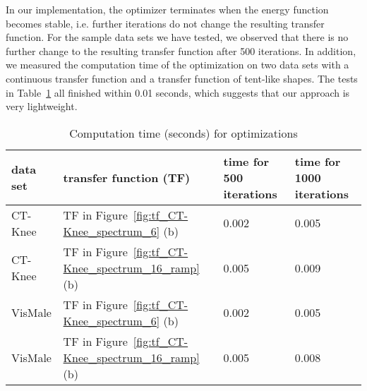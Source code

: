 In our implementation, the optimizer terminates when the energy function becomes stable, i.e. further iterations do not change the resulting transfer function. For the sample data sets we have tested, we observed that there is no further change to the resulting transfer function after 500 iterations.
In addition, we measured the computation time of the optimization on two data sets with a continuous transfer function and a transfer function of tent-like shapes.
The tests in Table~\ref{table:tf_refinement_performance} all finished within 0.01 seconds, which suggests that our approach is very lightweight.



\begin{table}
\centering
\normalsize
\begin{tabular}{llll}
	\hline
	data set & transfer function (TF) & time for 500 iterations & time for 1000 iterations \\
	\hline
	CT-Knee & TF in Figure~\ref{fig:tf_CT-Knee_spectrum_6} (b) & 0.002 & 0.005 \\
	\hline
	CT-Knee & TF in Figure~\ref{fig:tf_CT-Knee_spectrum_16_ramp} (b) & 0.005 & 0.009 \\
	\hline
	VisMale & TF in Figure~\ref{fig:tf_CT-Knee_spectrum_6} (b) & 0.002 & 0.005 \\
	\hline
	VisMale & TF in Figure~\ref{fig:tf_CT-Knee_spectrum_16_ramp} (b) & 0.005 & 0.008 \\
\end{tabular}
\caption{Computation time (seconds) for optimizations}
\label{table:tf_refinement_performance}
\end{table}

